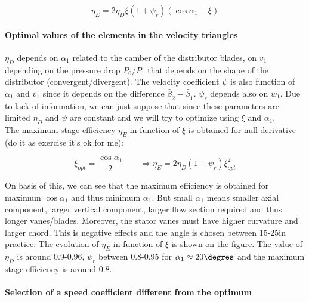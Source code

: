\begin{equation}
\eta _E = 2\eta _D \xi (1+\psi _r) \left( \cos \alpha _1 - \xi\right)
\end{equation} 

\paragraph{Optimal values of the elements in the velocity triangles}
$\eta _D$ depends on $\alpha _1$ related to the camber of the distributor blades, on $v_1$ depending on the pressure drop $P_0/P_1$ that depends on the shape of the distributor (convergent/divergent). The velocity coefficient $\psi$ is also function of $\alpha _1$ and $v_1$ since it depends on the difference $\bar{\beta} _2 - \bar{\beta} _1$. $\psi _r$ depends also on $w_1$. Due to lack of information, we can just suppose that since these parameters are limited $\eta _D$ and $\psi$ are constant and we will try to optimize using $\xi$ and $\alpha _1$. \\

The maximum stage efficiency $\eta _E$ in function of $\xi$ is obtained for null derivative (do it as exercise it's ok for me): 

\begin{equation}
\xi _{opt} = \frac{\cos \alpha _1}{2} \qquad \Rightarrow \eta _E = 2\eta _D (1+\psi _r) \xi _{opt}^2
\end{equation} 

On basis of this, we can see that the maximum efficiency is obtained for maximum $\cos \alpha _1$ and thus minimum $\alpha _1$. But small $\alpha _1$ means smaller axial component, larger vertical component, larger flow section required and thus longer vanes/blades. Moreover, the stator vanes must have higher curvature and larger chord. This is negative effects and the angle is chosen between 15-25\degres in practice. The evolution of $\eta _E$ in function of $\xi$ is shown on the figure. The value of $\eta _D$ is around 0.9-0.96, $\psi _r$ between 0.8-0.95 for $\alpha _1 \approx 20\degres$ and the maximum stage efficiency is around 0.8.

\paragraph{Selection of a speed coefficient different from the optimum}
